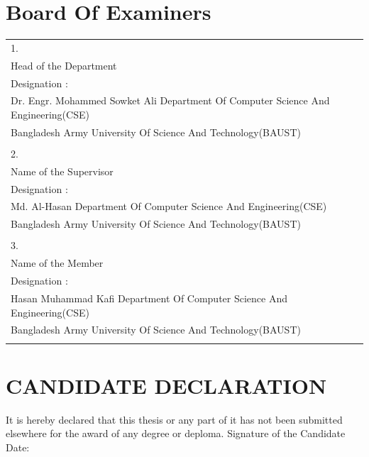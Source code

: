 \documentclass[a4paper,12pt]{article}
\begin{document}
\newpage
\centering\section*{Board Of Examiners}
\begin{tabular}{ll}
\large
1.\\
Head of the Department\\
Designation : \\ Dr. Engr. Mohammed Sowket Ali
Department Of Computer Science And Engineering(CSE)\\
Bangladesh Army University Of Science And Technology(BAUST)\\
\\
2.\\
Name of the Supervisor\\
Designation : \\ Md. Al-Hasan
Department Of Computer Science And Engineering(CSE)\\
Bangladesh Army University Of Science And Technology(BAUST)\\
\\
3.\\
Name of the Member\\
Designation : \\ 
Hasan Muhammad Kafi
Department Of Computer Science And Engineering(CSE)\\
Bangladesh Army University Of Science And Technology(BAUST)\\
\\
\end{tabular}
\vfill
\newpage
\centering\section*{CANDIDATE DECLARATION}
\justifying
It is hereby declared that this thesis or any part of it has not been submitted elsewhere for the award of any degree or deploma.
\vspace{3cm}\newline
Signature of the Candidate \newline
Date: \newline
\newpage
\end{document}
